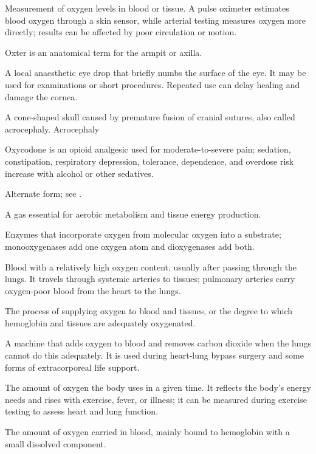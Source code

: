  Measurement of oxygen levels in blood or tissue. A pulse oximeter estimates blood oxygen through a skin sensor, while arterial testing measures oxygen more directly; results can be affected by poor circulation or motion.

 Oxter is an anatomical term for the armpit or axilla.

 A local anaesthetic eye drop that briefly numbs the surface of the eye. It may be used for examinations or short procedures. Repeated use can delay healing and damage the cornea.

 A cone-shaped skull caused by premature fusion of cranial sutures, also called acrocephaly.
\synonyms
Acrocephaly

 Oxycodone is an opioid analgesic used for moderate-to-severe pain; sedation, constipation, respiratory depression, tolerance, dependence, and overdose risk increase with alcohol or other sedatives.

 Alternate form; see .

 A gas essential for aerobic metabolism and tissue energy production.

 Enzymes that incorporate oxygen from molecular oxygen into a substrate; monooxygenases add one oxygen atom and dioxygenases add both.

 Blood with a relatively high oxygen content, usually after passing through the lungs. It travels through systemic arteries to tissues; pulmonary arteries carry oxygen-poor blood from the heart to the lungs.

 The process of supplying oxygen to blood and tissues, or the degree to which hemoglobin and tissues are adequately oxygenated.

 A machine that adds oxygen to blood and removes carbon dioxide when the lungs cannot do this adequately. It is used during heart-lung bypass surgery and some forms of extracorporeal life support.

 The amount of oxygen the body uses in a given time. It reflects the body’s energy needs and rises with exercise, fever, or illness; it can be measured during exercise testing to assess heart and lung function.

 The amount of oxygen carried in blood, mainly bound to hemoglobin with a small dissolved component.

